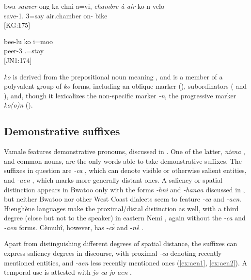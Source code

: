 \ea\label{ex:ko_generic}
\gll bwa \textit{sauver}-ong ka ehni a=vi, \textit{chambre-à-air} ko-n velo\\
  save-1.   3=say air.chamber on- bike \\
\glt {} {[KG:175]}
\z

\ea\label{ex:ko_specific}
\gll bee-lu ko i=moo\\
 peer-3  .=stay\\
\glt {} {[JN1:174]}
\z

\textit{ko} is derived from the prepositional noun meaning , and is a member of a polyvalent group of \textit{ko} forms, including an oblique marker (), subordinators ( and ), and, though it lexicalizes the non-specific marker \textit{-n}, the progressive marker \textit{ko(o)n} ().



\subsection{Demonstrative suffixes}
\label{ssec:DemSuff}
Vamale features demonstrative pronouns, discussed in . One of the latter, \textit{niena} , and common nouns, are the only words able to take demonstrative suffixes. The suffixes in question are \textit{-ca} , which can denote visible or otherwise salient entities, and \textit{-aen} , which marks more generally distant ones. A saliency or spatial distinction appears in Bwatoo only with the forms \textit{-hni} and \textit{-hanaa} \parencite[43]{rivierre_bwatoo_2006} discussed in , but neither Bwatoo nor other West Coast dialects seem to feature \textit{-ca} and \textit{-aen}. Hienghène languages make the proximal/distal distinction as well, with a third degree (close but not to the speaker) in eastern Nemi \parencite[255]{haudricourt_dictionnaire_1982}, again without the \textit{-ca} and \textit{-aen} forms. Cèmuhî, however, has -\textit{cɛ̀}  and -\textit{nè}  \parencite[92]{rivierre_langue_1980}.

Apart from distinguishing different degrees of spatial distance, the suffixes can express saliency degrees in discourse, with proximal \textit{-ca} denoting recently mentioned entities, and \textit{-aen} less recently mentioned ones (\ref{ex:aen1}, \ref{ex:aen2}). A temporal use is attested with \textit{jo-ca}  \textit{jo-aen} .


